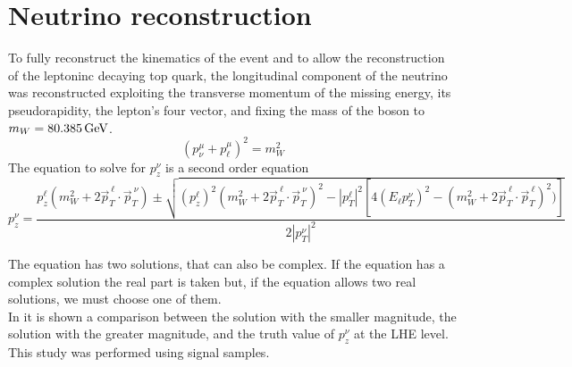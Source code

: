 \section{Neutrino reconstruction}\label{sec:nu_reco}
To fully reconstruct the kinematics of the event and to allow the reconstruction of the leptoninc decaying top quark, the longitudinal component of the neutrino was reconstructed exploiting the transverse momentum of the missing energy, its pseudorapidity, the lepton's four vector, and fixing the mass of the \PW boson to $m_W=80.385 {\,\text{Ge\hspace{-.08em}V}}$.
\begin{equation}
    (p^\mu_\nu+p^\mu_\ell)^2=m_W^2 
\end{equation}
The equation to solve for $p_z^{\nu}$ is a second order equation
\begin{equation*}
    p_z^\nu=\dfrac{p_z^\ell(m_W^2+2\vec{p}_T^{\:\ell} \cdot \vec{p}_T^{\:\nu})\pm\sqrt{(p_z^\ell)^2 (m_W^2+2\vec{p}_T^{\:\ell} \cdot \vec{p}_T^{\:\nu})^2-|p_T^\ell|^2[4(E_\ell p_T^\nu)^2-(m_W^2+2\vec{p}_T^{\:\ell} \cdot \vec{p}_T^{\:\ell})^2)]}}{2|p_T^\nu|^2}
\end{equation*}

The equation has two solutions, that can also be complex. If the equation has a complex solution the real part is taken but, if the equation allows two real solutions, we must choose one of them.\\
In  it is shown a comparison between the solution with the smaller magnitude, the solution with the greater magnitude, and the truth value of $p_z^\nu$ at the LHE level.\\
This study was performed using signal samples.



